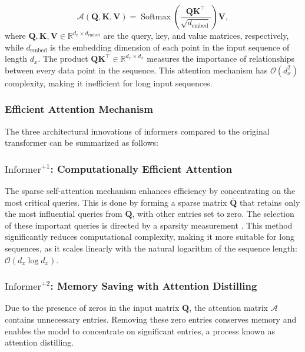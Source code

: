 \documentclass{ieeetmlcn}
\begin{document}
\begin{equation}
\mathcal{A}(\mathbf{Q}, \mathbf{K}, \mathbf{V}) = \operatorname{Softmax}\left(\frac{\mathbf{QK}^\top}{\sqrt{d_{\text{embed}}}}\right) \mathbf{V},
\end{equation}
where $\mathbf{Q}, \mathbf{K}, \mathbf{V} \in \mathbb{R}^{d_x \times d_{\text{embed}}}$ are the query, key, and value matrices, respectively, while $d_{\text{embed}}$ is the embedding dimension of each point in the input sequence of length $d_x$. The product $\mathbf{QK}^\top \in \mathbb{R}^{d_x \times d_x}$ measures the importance of relationships between every data point in the sequence. This attention mechanism has $\mathcal{O}(d_x^2)$ complexity, making it inefficient for long input sequences.


\subsubsection*{Efficient Attention Mechanism}

The three architectural innovations of informers compared to the original transformer can be summarized as follows:
\subsubsection*{$\text{Informer}^{+1}$: Computationally Efficient Attention}

The sparse self-attention mechanism enhances efficiency by concentrating on the most critical queries. This is done by forming a sparse matrix $\overline{\mathbf{Q}}$ that retains only the most influential queries from $\mathbf{Q}$, with other entries set to zero. The selection of these important queries is directed by a sparsity measurement \cite{zhou2021informer}. This method significantly reduces computational complexity, making it more suitable for long sequences, as it scales linearly with the natural logarithm of the sequence length: $\mathcal{O}(d_x \log d_x)$.

\subsubsection*{$\text{Informer}^{+2}$: Memory Saving with Attention Distilling}

Due to the presence of zeros in the input matrix $\overline{\mathbf{Q}}$, the attention matrix $\mathcal{A}$ contains unnecessary entries. Removing these zero entries conserves memory and enables the model to concentrate on significant entries, a process known as attention distilling.
\end{document}
